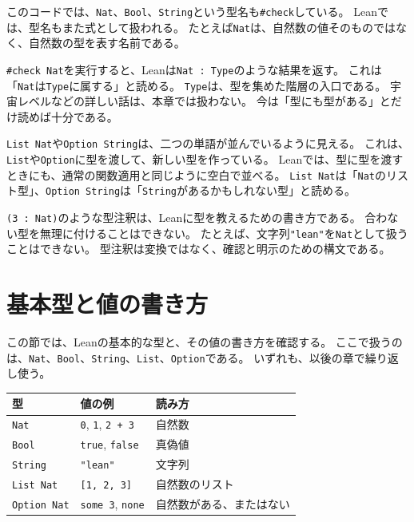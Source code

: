 このコードでは、\texttt{Nat}、\texttt{Bool}、\texttt{String}という型名も\texttt{\#check}している。
Leanでは、型名もまた式として扱われる。
たとえば\texttt{Nat}は、自然数の値そのものではなく、自然数の型を表す名前である。

\begin{leanbox}
\texttt{\#check Nat}を実行すると、Leanは\texttt{Nat : Type}のような結果を返す。
これは「\texttt{Nat}は\texttt{Type}に属する」と読める。
\texttt{Type}は、型を集めた階層の入口である。
宇宙レベルなどの詳しい話は、本章では扱わない。
今は「型にも型がある」とだけ読めば十分である。
\end{leanbox}

\texttt{List Nat}や\texttt{Option String}は、二つの単語が並んでいるように見える。
これは、\texttt{List}や\texttt{Option}に型を渡して、新しい型を作っている。
Leanでは、型に型を渡すときにも、通常の関数適用と同じように空白で並べる。
\texttt{List Nat}は「\texttt{Nat}のリスト型」、\texttt{Option String}は「\texttt{String}があるかもしれない型」と読める。

\begin{warningbox}
\texttt{(3 : Nat)}のような型注釈は、Leanに型を教えるための書き方である。
合わない型を無理に付けることはできない。
たとえば、文字列\texttt{"lean"}を\texttt{Nat}として扱うことはできない。
型注釈は変換ではなく、確認と明示のための構文である。
\end{warningbox}

\section{基本型と値の書き方}

この節では、Leanの基本的な型と、その値の書き方を確認する。
ここで扱うのは、\texttt{Nat}、\texttt{Bool}、\texttt{String}、\texttt{List}、\texttt{Option}である。
いずれも、以後の章で繰り返し使う。

\begin{center}
\begin{tabular}{lll}
\toprule
型 & 値の例 & 読み方 \\
\midrule
\texttt{Nat} & \texttt{0}, \texttt{1}, \texttt{2 + 3} & 自然数 \\
\texttt{Bool} & \texttt{true}, \texttt{false} & 真偽値 \\
\texttt{String} & \texttt{"lean"} & 文字列 \\
\texttt{List Nat} & \texttt{[1, 2, 3]} & 自然数のリスト \\
\texttt{Option Nat} & \texttt{some 3}, \texttt{none} & 自然数がある、またはない \\
\bottomrule
\end{tabular}
\end{center}


